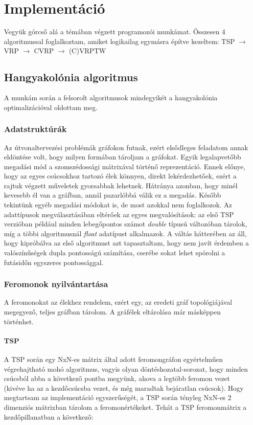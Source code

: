 \chapter{Implementáció} \label{implementationChapter}

Vegyük górcső alá a témában végzett programozói munkámat. Összesen 4 algoritmussal foglalkoztam, amiket logikailag egymásra építve kezeltem:
TSP  \(\rightarrow\) VRP \(\rightarrow\) CVRP \(\rightarrow\) (C)VRPTW

\section{Hangyakolónia algoritmus}
A munkám során a felsorolt algoritmusok mindegyikét a hangyakolónia optimalizációval oldottam meg.

\subsection{Adatstruktúrák}
Az útvonaltervezési problémák gráfokon futnak, ezért elsődleges feladatom annak eldöntése volt, hogy milyen formában tároljam a gráfokat. Egyik legalapvetőbb megadási mód a szomszédossági mátrixával történő reprezentáció. Ennek előnye, hogy az egyes csúcsokhoz tartozó élek könnyen, direkt lekérdezhetőek, ezért a rajtuk végzett műveletek gyorsabbak lehetnek. Hátránya azonban, hogy minél kevesebb él van a gráfban, annál pazarlóbbá válik ez a megadás. Később tekintünk egyéb megadási módokat is, de most azokkal nem foglalkozok.
Az adattípusok megválasztásában eltérőek az egyes megvalósítások: az első TSP verzióban például minden lebegőpontos számot \textit{double} típusú változóban tárolok, míg a többi algoritmusnál \textit{float} adatípust alkalmazok. A váltás hátterében az áll, hogy kipróbálva az első algoritmust azt tapasztaltam, hogy nem javít érdemben a valószínűségek dupla pontosságú számítása, cserébe sokat lehet spórolni a futásidőn egyszeres pontossággal.


\subsection{Feromonok nyilvántartása}
A feromonokat az élekhez rendelem, ezért egy, az eredeti gráf topológiájával megegyező, teljes gráfban tárolom. A gráfélek eltárolása már másképpen történhet. 

\subsubsection{TSP}
A TSP során egy NxN-es mátrix által adott feromongráfon egyértelműen végrehajtható mohó algoritmus, vagyis olyan döntéshozatal-sorozat, hogy minden csúcsból abba a következő pontba megyünk, ahova a legtöbb feromon vezet (kivéve ha az a kezdőcsúcsba vezet, és még maradtak bejáratlan csúcsok). Hogy megtartsam az implementáció egyszerűségét, a TSP során tényleg NxN-es 2 dimenziós mátrixban tárolom a feromonértékeket. Tehát a TSP feromonmátrix a kezdőpillanatban a következő:

